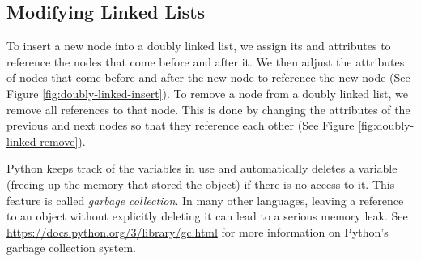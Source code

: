 \subsection*{Modifying Linked Lists} %

To insert a new node into a doubly linked list, we assign its  and  attributes to reference the nodes that come before and after it.
We then adjust the attributes of nodes that come before and after the new node to reference the new node (See Figure \ref{fig:doubly-linked-insert}).
To remove a node from a doubly linked list, we remove all references to that node. 
This is done by changing the attributes of the previous and next nodes so that they reference each other (See Figure \ref{fig:doubly-linked-remove}).

\begin{warn} %
  Python keeps track of the variables in use and automatically deletes a variable (freeing up the memory that stored the object) if there is no access to it.
  This feature is called \emph{garbage collection}.
  In many other languages, leaving a reference to an object without explicitly deleting it can lead to a serious memory leak.
  See \url{https://docs.python.org/3/library/gc.html} for more information on Python's garbage collection system.
\end{warn}


